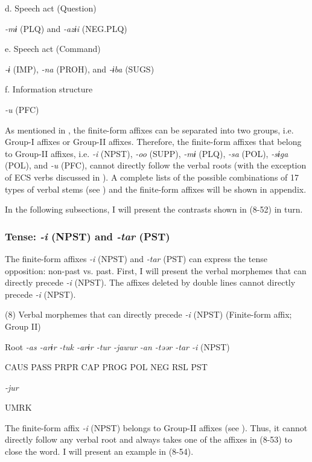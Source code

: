  d.  Speech act (Question)

    \textit{{}-mɨ} (PLQ) and \textit{{}-azɨi} (NEG.PLQ)

  e.  Speech act (Command)

    \textit{{}-ɨ} (IMP), \textit{{}-na} (PROH), and \textit{{}-ɨba} (SUGS)

  f.  Information structure

    \textit{{}-u} (PFC)

As mentioned in , the finite-form affixes can be separated into two groups, i.e. Group-I affixes or Group-II affixes. Therefore, the finite-form affixes that belong to Group-II affixes, i.e. \textit{{}-i} (NPST), \textit{{}-oo} (SUPP), \textit{{}-mɨ} (PLQ), \textit{{}-sa} (POL), \textit{{}-sɨga} (POL), and \textit{{}-u} (PFC), cannot directly follow the verbal roots (with the exception of ECS verbs discussed in ). A complete lists of the possible combinations of 17 types of verbal stems (see ) and the finite-form affixes will be shown in appendix.

In the following subsections, I will present the contrasts shown in (8-52) in turn.

\subsubsection{Tense: \textit{{}-i} (NPST) and \textit{{}-tar} (PST)}

The finite-form affixes \textit{{}-i} (NPST) and \textit{{}-tar} (PST) can express the tense opposition: non-past vs. past. First, I will present the verbal morphemes that can directly precede \textit{{}-i} (NPST). The affixes deleted by double lines cannot directly precede \textit{{}-i} (NPST).

(8)  Verbal morphemes that can directly precede \textit{{}-i} (NPST) (Finite-form affix; Group II)

  Root  \textit{{}-as  {}-arɨr} %
\textit{{}-tuk  {}-arɨr  {}-tur  {}-jawur} %
\textit{{}-an  {}-təər  {}-tar  {}-i} (NPST)

    CAUS  PASS  PRPR  CAP  PROG  POL  NEG  RSL  PST  

          \textit{{}-jur} 

          UMRK    

The finite-form affix \textit{{}-i} (NPST) belongs to Group-II affixes (see ). Thus, it cannot directly follow any verbal root and always takes one of the affixes in (8-53) to close the word. I will present an example in (8-54).

